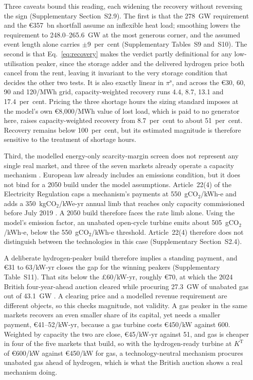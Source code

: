 Three caveats bound this reading, each widening the recovery without reversing the sign
(Supplementary Section~S2.9). The first is that the 278~GW requirement and the
\euro{}357~bn shortfall assume an inflexible heat load; smoothing lowers the requirement
to 248.0--265.6~GW at the most generous corner, and the assumed event length alone
carries $\pm$9~per~cent (Supplementary Tables~S9 and~S10). The second
is that Eq.~\eqref{eq:recovery} makes the verdict partly definitional for any
low-utilisation peaker, since the storage adder and the delivered hydrogen price both
cancel from the rent, leaving it invariant to the very storage condition that decides
the other two tests. It is also exactly linear in $\pi^{\mathrm{s}}$, and across the \euro{}30, 60, 90 and 120/MWh grid, capacity-weighted recovery runs 4.4, 8.7, 13.1 and
17.4~per~cent. Pricing the three shortage hours the sizing standard imposes at the
model's own \euro{}8{,}000/MWh value of lost load, which is paid to no generator here,
raises capacity-weighted recovery from 8.7~per~cent to about 51~per~cent. Recovery
remains below 100~per~cent, but its estimated magnitude is therefore sensitive to the
treatment of shortage hours.

Third, the modelled energy-only scarcity-margin screen does not represent any single real
market, and three of the seven markets already operate a capacity mechanism
\citep{ACER2023capacity}. European law already includes an emissions condition, but it
does not bind for a 2050 build under the model assumptions. Article~22(4) of the
Electricity Regulation caps a mechanism's payments at 550~gCO$_2$/kWh-e and adds a
350~kgCO$_2$/kWe-yr annual limb that reaches only capacity commissioned before July 2019
\citep{EU2019ElectricityRegulation}. A 2050 build therefore faces the rate limb alone.
Using the model's emission factor, an unabated open-cycle turbine emits about
505~gCO$_2$/kWh-e, below the 550~gCO$_2$/kWh-e threshold. Article~22(4) therefore does not
distinguish between the technologies in this case (Supplementary Section~S2.4).

A deliberate hydrogen-peaker build therefore implies a standing payment, and \euro{}31
to 63/kW-yr closes the gap for the winning peakers (Supplementary Table~S11). That sits below the \pounds{}60/kW-yr, roughly \euro{}70, at which the 2024 British four-year-ahead auction cleared while procuring 27.3~GW of unabated gas out of 43.1~GW \citep{DESNZ2025T4auction}. A clearing price and a modelled revenue requirement are different objects, so this checks magnitude, not validity. A gas peaker in the same
markets recovers an even smaller share of its capital, yet needs a smaller payment,
\euro{}41--52/kW-yr, because a gas turbine costs \euro{}450/kW against 600. Weighted by capacity the two are close,
\euro{}45/kW-yr against 51, and gas is cheaper in four of the five markets that build,
so with the hydrogen-ready turbine at $K^{\mathrm{T}}$ of \euro{}600/kW against \euro{}450/kW for gas, a technology-neutral mechanism procures unabated gas ahead of hydrogen, which is what the British auction shows a real
mechanism doing.

